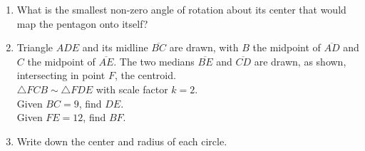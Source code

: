 \documentclass[12pt, twoside]{article}
\begin{document}
\begin{enumerate}
 \newpage

   \item What is the smallest non-zero angle of rotation about its center that would map the pentagon onto itself? \vspace{0.25cm} %
   \begin{center}
     \end{center} \vspace{0.5cm}

  \item Triangle $ADE$ and its midline $\overline{BC}$ are drawn, with $B$ the midpoint of $\overline{AD}$ and $C$ the midpoint of $\overline{AE}$. The two medians $\overline{BE}$ and $\overline{CD}$ are drawn, as shown, intersecting in point $F$, the centroid.\\[0.25cm]
  $\triangle FCB \sim \triangle FDE$ with scale factor $k=2$.\\[0.25cm]
  Given $BC=9$, find $DE$. \\[0.25cm] Given $FE=12$, find $BF$. %
  \begin{center}
    \end{center} \vspace{1cm}

  \item Write down the center and radius of each circle.
    \begin{enumerate}
    \end{enumerate}


\end{enumerate}
\end{document}
